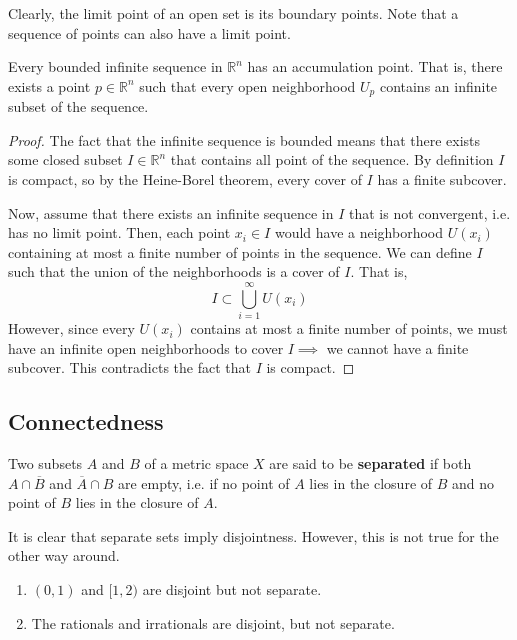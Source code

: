 \documentclass{article}
\begin{document}
    Clearly, the limit point of an open set is its boundary points. Note that a sequence of points can also have a limit point. 

    \begin{theorem}
      Every bounded infinite sequence in $\mathbb{R}^n$ has an accumulation point. That is, there exists a point $p \in \mathbb{R}^n$ such that every open neighborhood $U_p$ contains an infinite subset of the sequence. 
    \end{theorem}
    \begin{proof}
      The fact that the infinite sequence is bounded means that there exists some closed subset $I \in \mathbb{R}^n$ that contains all point of the sequence. By definition $I$ is compact, so by the Heine-Borel theorem, every cover of $I$ has a finite subcover. 

      Now, assume that there exists an infinite sequence in $I$ that is not convergent, i.e. has no limit point. Then, each point $x_i \in I$ would have a neighborhood $U(x_i)$ containing at most a finite number of points in the sequence. We can define $I$ such that the union of the neighborhoods is a cover of $I$. That is, 
      \[I \subset \bigcup_{i=1}^\infty U(x_i)\]
      However, since every $U(x_i)$ contains at most a finite number of points, we must have an infinite open neighborhoods to cover $I \implies$ we cannot have a finite subcover. This contradicts the fact that $I$ is compact. 
    \end{proof}

  \subsection{Connectedness}

    \begin{definition}
      Two subsets $A$ and $B$ of a metric space $X$ are said to be \textbf{separated} if both $A \cap \overline{B}$ and $\overline{A} \cap B$ are empty, i.e. if no point of $A$ lies in the closure of $B$ and no point of $B$ lies in the closure of $A$. 
    \end{definition}

    \begin{example}
      It is clear that separate sets imply disjointness. However, this is not true for the other way around. 
      \begin{enumerate}
        \item $(0, 1)$ and $[1, 2)$ are disjoint but not separate. 
        \item The rationals and irrationals are disjoint, but not separate. 
      \end{enumerate}
    \end{example}
\end{document}
